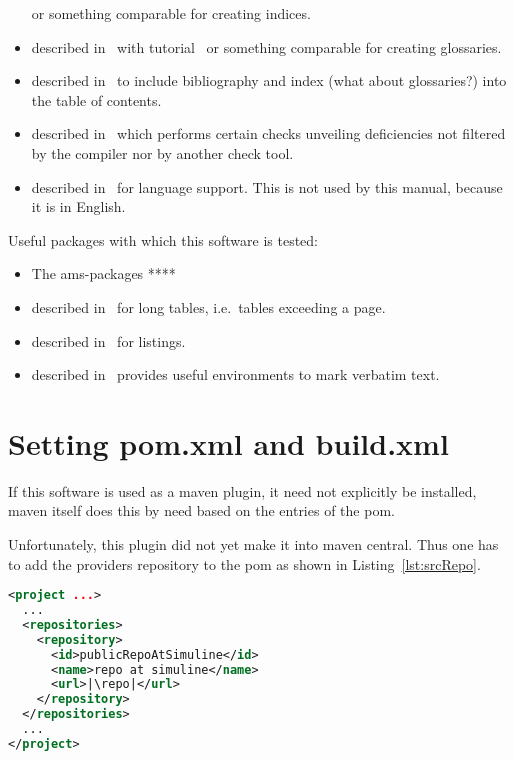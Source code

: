 \begin{itemize}
or something comparable for creating indices. 
\item 
{} described in~\cite{GloP} 
with tutorial~\cite{GloPGuide}
or something comparable for creating glossaries. 
\item 
{} described in~\cite{TocBibIndP} 
to include bibliography and index (what about glossaries?) 
into the table of contents. 
\item 
{} described in~\cite{NagP} 
which performs certain checks unveiling deficiencies 
not filtered by the compiler nor by another check tool. 
\item 
{} described in~\cite{BabelP} for language support. 
This is not used by this manual, because it is in English. 
\end{itemize}

\noindent
Useful packages with which this software is tested: 
%
\begin{itemize}
\item
The ams-packages **** 
\item
{} described in~\cite{LongTabP} 
for long tables, i.e.~tables exceeding a page. 
\item
{} described in~\cite{ListingsP} for listings. 
\item
{} described in~\cite{FancyVerbP} 
provides useful environments to mark verbatim text. 
\end{itemize}


\section{Setting pom.xml and build.xml}\label{sec:sgml}

If this software is used as a maven plugin,
it need not explicitly be installed, maven itself does this by need
based on the entries of the pom.

Unfortunately, this plugin did not yet make it into maven central.
Thus one has to add the providers repository to the pom
as shown in Listing~\ref{lst:srcRepo}. 

\begin{lstlisting}[language=xml, basicstyle=\footnotesize,
escapechar=|,
float, captionpos=b, label={lst:srcRepo}, 
caption={The source repository for this plugin}]
<project ...>
  ...
  <repositories>
    <repository>
      <id>publicRepoAtSimuline</id>
      <name>repo at simuline</name>
      <url>|\repo|</url>
    </repository>
  </repositories>
  ...
</project>
\end{lstlisting}

